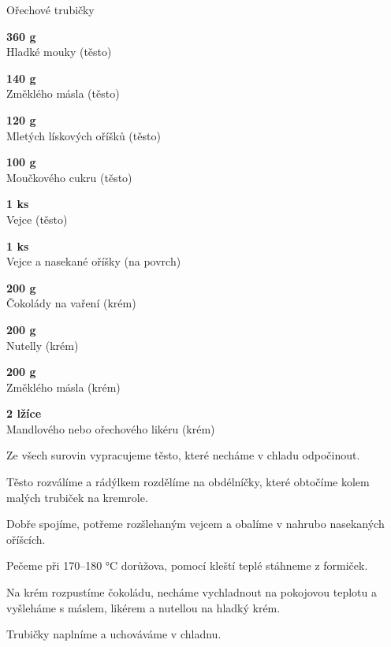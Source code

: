 \documentclass[11pt,a4paper]{article}
\begin{document}
\begin{recipe}[MediumOrchid]{Ořechové trubičky}
    \begin{ingredients}
        \item \parbox[t]{\linewidth}{\raggedright \weight \textbf{360 g}\\ Hladké mouky (těsto)}
        \item \parbox[t]{\linewidth}{\raggedright \weight \textbf{140 g}\\ Změklého másla (těsto)}
        \item \parbox[t]{\linewidth}{\raggedright \weight \textbf{120 g}\\ Mletých lískových oříšků (těsto)}
        \item \parbox[t]{\linewidth}{\raggedright \weight \textbf{100 g}\\ Moučkového cukru (těsto)}
        \item \parbox[t]{\linewidth}{\raggedright \piece \textbf{1 ks}\\ Vejce (těsto)}
        \item \parbox[t]{\linewidth}{\raggedright \piece \textbf{1 ks}\\ Vejce a nasekané oříšky (na povrch)}
        \item \parbox[t]{\linewidth}{\raggedright \weight \textbf{200 g}\\ Čokolády na vaření (krém)}
        \item \parbox[t]{\linewidth}{\raggedright \weight \textbf{200 g}\\ Nutelly (krém)}
        \item \parbox[t]{\linewidth}{\raggedright \weight \textbf{200 g}\\ Změklého másla (krém)}
        \item \parbox[t]{\linewidth}{\raggedright \spoon \textbf{2 lžíce}\\ Mandlového nebo ořechového likéru (krém)}
    \end{ingredients}
    \begin{steps}
        \item Ze všech surovin vypracujeme těsto, které necháme v chladu odpočinout.
        \item Těsto rozválíme a rádýlkem rozdělíme na obdélníčky, které obtočíme kolem malých trubiček na kremrole.
        \item Dobře spojíme, potřeme rozšlehaným vejcem a obalíme v nahrubo nasekaných oříšcích.
        \item Pečeme při 170--180 °C dorůžova, pomocí kleští teplé stáhneme z formiček.
        \item Na krém rozpustíme čokoládu, necháme vychladnout na pokojovou teplotu a vyšleháme s máslem, likérem a nutellou na hladký krém.
        \item Trubičky naplníme a uchováváme v chladnu.
    \end{steps}
\end{recipe}
\end{document}
